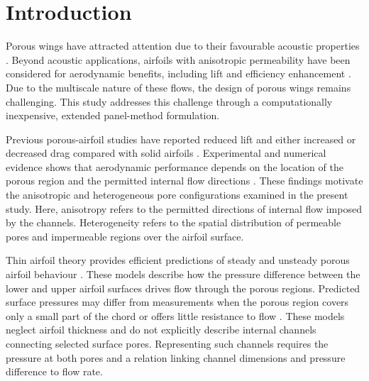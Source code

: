\documentclass[a4paper,fleqn]{cas-dc}
\begin{document}
	
	\maketitle
	
	\section{Introduction}
	\label{sec:introduction}

Porous wings have attracted attention due to their favourable acoustic properties \cite{Zhu2023NACA0018PorousTrailingEdge}. Beyond acoustic applications, airfoils with anisotropic permeability have been considered for aerodynamic benefits, including lift and efficiency enhancement \cite{Hanna2019PorosityModerateRe,Li2023PartiallyPorousAirfoils}. 
Due to the multiscale nature of these flows, the design of porous wings remains challenging. 
This study addresses this challenge through a computationally inexpensive, extended panel-method formulation.

Previous porous-airfoil studies have reported reduced lift and either increased or decreased drag compared with solid airfoils \cite{Mineck1996FullChordPorosity,Aldheeb2018PorousAirfoilsWings}. 
Experimental and numerical evidence shows that aerodynamic performance depends on the location of the porous region and the permitted internal flow directions \cite{Hanna2019PorosityModerateRe,Zhu2023NACA0018PorousTrailingEdge,Li2023PartiallyPorousAirfoils}. 
These findings motivate the anisotropic and heterogeneous pore configurations examined in the present study. 
Here, anisotropy refers to the permitted directions of internal flow imposed by the channels. 
Heterogeneity refers to the spatial distribution of permeable pores and impermeable regions over the airfoil surface.
	
Thin airfoil theory provides efficient predictions of steady and unsteady porous airfoil behaviour \cite{Hajian2017PorosityGradients,Baddoo2021UnsteadyPorousAerofoils}.
These models describe how the pressure difference between the lower and upper airfoil surfaces drives flow through the porous regions.
Predicted surface pressures may differ from measurements when the porous region covers only a small part of the chord or offers little resistance to flow \cite{Luesutthiviboon2019ThinAirfoilAssessment}.
These models neglect airfoil thickness and do not explicitly describe internal channels connecting selected surface pores. Representing such channels requires the pressure at both pores and a relation linking channel dimensions and pressure difference to flow rate.
\end{document}
